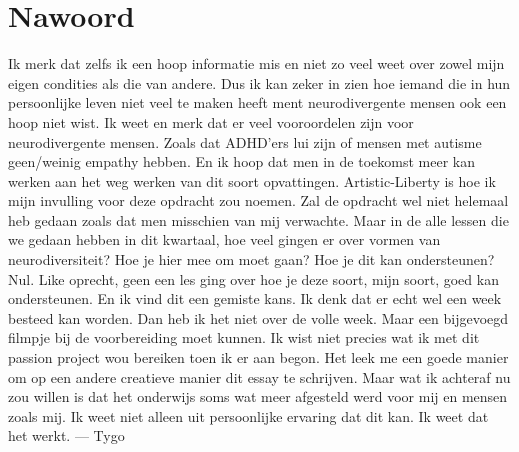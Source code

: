 \documentclass{article}
\begin{document}
    \section{Nawoord}
        Ik merk dat zelfs ik een hoop informatie mis en niet zo veel weet over zowel mijn eigen condities als die van andere. Dus ik kan zeker in zien hoe iemand die in hun persoonlijke leven niet veel te maken heeft ment neurodivergente mensen ook een hoop niet wist. 
        \bigskip
        \noindent Ik weet en merk dat er veel vooroordelen zijn voor neurodivergente mensen. Zoals dat ADHD'ers lui zijn of mensen met autisme geen/weinig empathy hebben. En ik hoop dat men in de toekomst meer kan werken aan het weg werken van dit soort opvattingen. 
        \bigskip
        \noindent Artistic-Liberty is hoe ik mijn invulling voor deze opdracht zou noemen. Zal de opdracht wel niet helemaal heb gedaan zoals dat men misschien van mij verwachte. Maar in de alle lessen die we gedaan hebben in dit kwartaal, hoe veel gingen er over vormen van neurodiversiteit? Hoe je hier mee om moet gaan? Hoe je dit kan ondersteunen? Nul. Like oprecht, geen een les ging over hoe je deze soort, mijn soort, goed kan ondersteunen. En ik vind dit een gemiste kans. Ik denk dat er echt wel een week besteed kan worden. Dan heb ik het niet over de volle week. Maar een bijgevoegd filmpje bij de voorbereiding moet kunnen.
        \bigskip
        \noindent Ik wist niet precies wat ik met dit passion project wou bereiken toen ik er aan begon. Het leek me een goede manier om op een andere creatieve manier dit essay te schrijven. Maar wat ik achteraf nu zou willen is dat het onderwijs soms wat meer afgesteld werd voor mij en mensen zoals mij. Ik weet niet alleen uit persoonlijke ervaring dat dit kan. Ik weet  dat het werkt. 
        \bigskip\bigskip
        — Tygo
        \label{LastPage}
    \newpage
    
    
\end{document}
